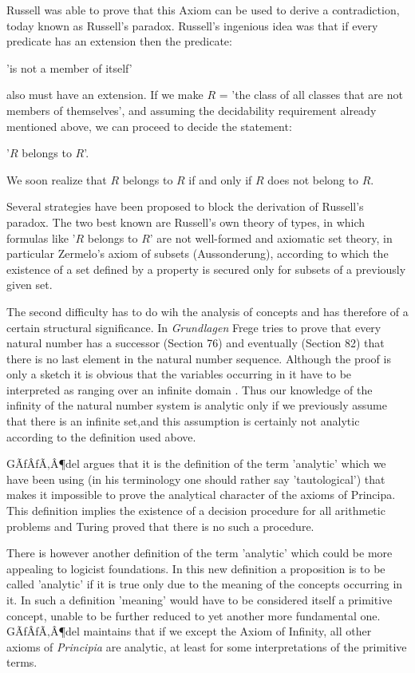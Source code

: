 \documentclass[12pt]{article}
\begin{document}
Russell was able to prove that this Axiom can be used to derive a contradiction, today known as Russell's paradox. Russell's ingenious idea was that if every predicate has an extension then the predicate:
 
\begin{center}
'is not a member of itself'
\end{center}

also must have an extension. If we make $R$ = 'the class of all classes that are not members of themselves', and assuming the decidability requirement already mentioned above, we can proceed  to decide the statement:

\begin{center}
'$R$ belongs to $R$'.
\end{center}

We soon realize that $R$ belongs to $R$ if and only if $R$ does not belong to $R$.

Several strategies have been proposed to block the derivation of Russell's paradox. The two best known are Russell's own theory of types, in which formulas like '$R$ belongs to $R$' are not well-formed and axiomatic set theory, in particular  Zermelo's axiom of subsets (Aussonderung), according to which the existence of a set defined by a property is secured only for subsets of a previously given set.

The second difficulty  has to do wih the analysis of concepts and has therefore of a certain structural significance. In \emph{Grundlagen} Frege tries to prove that every natural number has a successor (Section 76)  and eventually (Section 82) that there is no last element in the natural number sequence. Although the  proof is only a sketch it is obvious that the variables occurring in it have to be interpreted as ranging over an infinite domain . Thus our knowledge of the infinity of the natural number system is analytic only if we previously assume that there is an infinite set,and this assumption is certainly not analytic according to  the definition used above.

GÃƒÂƒÃ‚Â¶del argues that it is the definition of the term 'analytic' which we have been using (in his terminology one should rather say  'tautological') that makes it impossible to prove the analytical character of the axioms of Principa. This definition implies the existence of a decision procedure for all arithmetic problems and Turing proved that there is no such a procedure.

There is however another definition of the term 'analytic' which could be more appealing to  logicist foundations. In this new definition a proposition  is to be called 'analytic' if it is  true only due to the meaning of the concepts occurring in it. In such a definition 'meaning' would have to be considered itself a primitive concept, unable to be further reduced to yet  another more fundamental one. GÃƒÂƒÃ‚Â¶del maintains that if we except the Axiom of Infinity, all other axioms of \emph{Principia} are analytic, at least for some interpretations of the primitive terms.
\end{document}
